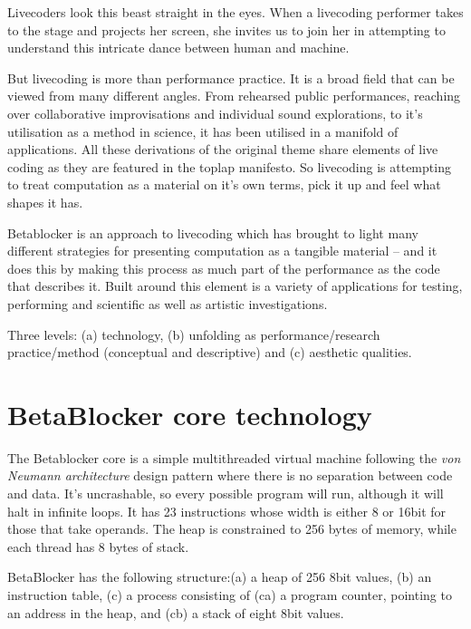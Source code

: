 \documentclass[letterpaper, 12pt]{article}
\begin{document}
Livecoders look this beast straight in the eyes. 
When a livecoding performer takes to the stage and projects her screen, she invites us to join her in attempting to understand this intricate dance between human and machine. 

But livecoding is more than performance practice.
It is a broad field that can be viewed from many different angles.
From rehearsed public performances, reaching over collaborative improvisations and individual sound explorations, to it's utilisation as a method in science, it has been utilised in a manifold of applications.
All these derivations of the original theme share elements of live coding as they are featured in the toplap manifesto.
So livecoding is attempting to treat computation as a material on it's own terms, pick it up and feel what shapes it has.

Betablocker is an approach to livecoding which has brought to light many different strategies for presenting computation as a tangible material -- and it does this by making this process as much part of the performance as the code that describes it.
Built around this element is a variety of applications for testing, performing and scientific as well as artistic investigations.

Three levels: (a) technology, (b) unfolding as performance/research practice/method (conceptual and descriptive) and (c) aesthetic qualities.



\parskip 18pt

\section*{BetaBlocker core technology} %
\label{sec:betablocker_core}


The Betablocker core is a simple multithreaded virtual machine following the \emph{von Neumann architecture} design pattern where there is no separation between code and data.
It's uncrashable, so every possible program will run, although it will halt in infinite loops. 
It has 23 instructions whose width is either 8 or 16bit for those that take operands. The heap is constrained to 256 bytes of memory, while each thread has 8 bytes of stack. 


BetaBlocker has the following structure:(a) a heap of 256 8bit values, (b) an instruction table, (c) a process consisting of (ca) a program counter, pointing to an address in the heap, and (cb) a stack of eight 8bit values.
\end{document}
